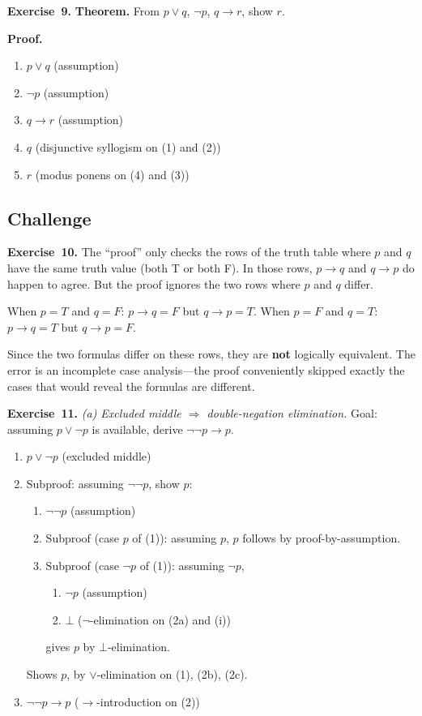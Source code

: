 \documentclass[11pt]{article}
\begin{document}
\medskip
\textbf{Exercise~9.}
\noindent\textbf{Theorem.} From $p \vee q$, $\lnot p$, $q \to r$, show $r$.

\noindent\textbf{Proof.}
\begin{enumerate}
  \item $p \vee q$ \hfill (assumption)
  \item $\lnot p$ \hfill (assumption)
  \item $q \to r$ \hfill (assumption)
  \item $q$ \hfill (disjunctive syllogism on (1) and (2))
  \item $r$ \hfill (modus ponens on (4) and (3))
\end{enumerate}

\subsection*{Challenge}

\textbf{Exercise~10.}
The ``proof'' only checks the rows of the truth table where $p$ and $q$
have the same truth value (both T or both F). In those rows, $p \to q$
and $q \to p$ do happen to agree. But the proof ignores the two rows
where $p$ and $q$ differ.

When $p = T$ and $q = F$: $p \to q = F$ but $q \to p = T$.
When $p = F$ and $q = T$: $p \to q = T$ but $q \to p = F$.

Since the two formulas differ on these rows, they are \textbf{not}
logically equivalent. The error is an incomplete case analysis---the
proof conveniently skipped exactly the cases that would reveal the
formulas are different.

\medskip
\textbf{Exercise~11.}
\emph{(a) Excluded middle $\Rightarrow$ double-negation elimination.}
Goal: assuming $p \vee \lnot p$ is available, derive $\lnot\lnot p \to p$.
\begin{enumerate}
  \item $p \vee \lnot p$ \hfill (excluded middle)
  \item Subproof: assuming $\lnot\lnot p$, show $p$:
    \begin{enumerate}[label=(2\alph*)]
      \item $\lnot\lnot p$ \hfill (assumption)
      \item Subproof (case $p$ of (1)): assuming $p$, $p$ follows by proof-by-assumption.
      \item Subproof (case $\lnot p$ of (1)): assuming $\lnot p$,
        \begin{enumerate}[label=(\roman*)]
          \item $\lnot p$ \hfill (assumption)
          \item $\bot$ \hfill ($\lnot$-elimination on (2a) and (i))
        \end{enumerate}
        gives $p$ by $\bot$-elimination.
    \end{enumerate}
    Shows $p$, by $\vee$-elimination on (1), (2b), (2c).
  \item $\lnot\lnot p \to p$ \hfill ($\to$-introduction on (2))
\end{enumerate}
\end{document}
